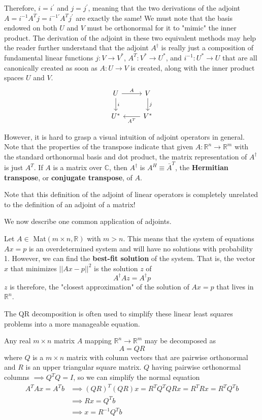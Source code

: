   Therefore, $i = i^\prime$ and $j = j^\prime$, meaning that the two derivations of the adjoint $A = i^{-1} A^T j = i^{-1 \prime} A^T j^\prime$ are exactly the same! We must note that the basis endowed on both $U$ and $V$ must be orthonormal for it to "mimic" the inner product. The derivation of the adjoint in these two equivalent methods may help the reader further understand that the adjoint $A^\dagger$ is really just a composition of fundamental linear functions $j: V \longrightarrow V^*$, $A^T: V^* \longrightarrow U^*$, and $i^{-1}: U^* \longrightarrow U$ that are all canonically created as soon as $A: U \longrightarrow V$ is created, along with the inner product spaces $U$ and $V$. 
  \[
    \begin{tikzcd}
      U \arrow{r}{A} \arrow{d}{i} & V \arrow{d}{j}\\
      U^* & V^* \arrow{l}{A^T}
    \end{tikzcd}
  \]

  However, it is hard to grasp a visual intuition of adjoint operators in general. Note that the properties of the transpose indicate that given $A: \mathbb{R}^n \longrightarrow \mathbb{R}^m$ with the standard orthonormal basis and dot product, the matrix representation of $A^\dagger$ is just $A^T$. If $A$ is a matrix over $\mathbb{C}$, then $A^\dagger$ is $A^H \equiv \bar{A}^T$, the \textbf{Hermitian transpose}, or \textbf{conjugate transpose}, of $A$. 

  Note that this definition of the adjoint of linear operators is completely unrelated to the definition of an adjoint of a matrix! 

  We now describe one common application of adjoints. 
  \begin{theorem}
  Let $A \in$ Mat$(m \times n, \mathbb{R})$ with $m > n$. This means that the system of equations $A x = p$ is an overdetermined system and will have no solutions with probability 1. However, we can find the \textbf{best-fit solution} of the system. That is, the vector $x$ that minimizes $||A x -p||^2$ is the solution $z$ of 
  \[ A^\dagger A z = A^\dagger p\]
  $z$ is therefore, the "closest approximation" of the solution of $A x = p$ that lives in $\mathbb{R}^n$. 
  \end{theorem}

  The QR decomposition is often used to simplify these linear least squares problems into a more manageable equation. 

  \begin{theorem}[QR Decomposition]
  Any real $m \times n$ matrix $A$ mapping $\mathbb{R}^n \longrightarrow \mathbb{R}^m$ may be decomposed as
  \[A = Q R\] 
  where $Q$ is a $m \times n$ matrix with column vectors that are pairwise orthonormal and $R$ is an upper triangular square matrix. $Q$ having pairwise orthonormal columns $\implies Q^T Q = I$, so we can simplify the normal equation
  \begin{align*}
      A^T A x = A^T b & \implies (Q R)^T (Q R) x = R^T Q^T Q R x = R^T R x = R^T Q^T b \\
      & \implies R x = Q^T b \\
      & \implies x = R^{-1} Q^T b
  \end{align*}
  \end{theorem}

